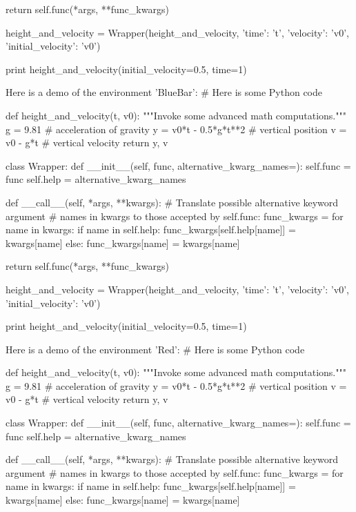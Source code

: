         return self.func(*args, **func_kwargs)

height_and_velocity = Wrapper(height_and_velocity,
                              {'time': 't',
                               'velocity': 'v0',
                               'initial_velocity': 'v0'})

print height_and_velocity(initial_velocity=0.5, time=1)


\noindent
Here is a demo of the environment 'BlueBar':
# Here is some Python code

def height_and_velocity(t, v0):
    """Invoke some advanced math computations."""
    g = 9.81                  # acceleration of gravity
    y = v0*t - 0.5*g*t**2     # vertical position
    v = v0 - g*t              # vertical velocity
    return y, v

class Wrapper:
    def __init__(self, func, alternative_kwarg_names={}):
        self.func = func
        self.help = alternative_kwarg_names

    def __call__(self, *args, **kwargs):
        # Translate possible alternative keyword argument
        # names in kwargs to those accepted by self.func:
        func_kwargs = {}
        for name in kwargs:
            if name in self.help:
                func_kwargs[self.help[name]] = kwargs[name]
            else:
                func_kwargs[name] = kwargs[name]

        return self.func(*args, **func_kwargs)

height_and_velocity = Wrapper(height_and_velocity,
                              {'time': 't',
                               'velocity': 'v0',
                               'initial_velocity': 'v0'})

print height_and_velocity(initial_velocity=0.5, time=1)


\noindent
Here is a demo of the environment 'Red':
# Here is some Python code

def height_and_velocity(t, v0):
    """Invoke some advanced math computations."""
    g = 9.81                  # acceleration of gravity
    y = v0*t - 0.5*g*t**2     # vertical position
    v = v0 - g*t              # vertical velocity
    return y, v

class Wrapper:
    def __init__(self, func, alternative_kwarg_names={}):
        self.func = func
        self.help = alternative_kwarg_names

    def __call__(self, *args, **kwargs):
        # Translate possible alternative keyword argument
        # names in kwargs to those accepted by self.func:
        func_kwargs = {}
        for name in kwargs:
            if name in self.help:
                func_kwargs[self.help[name]] = kwargs[name]
            else:
                func_kwargs[name] = kwargs[name]

